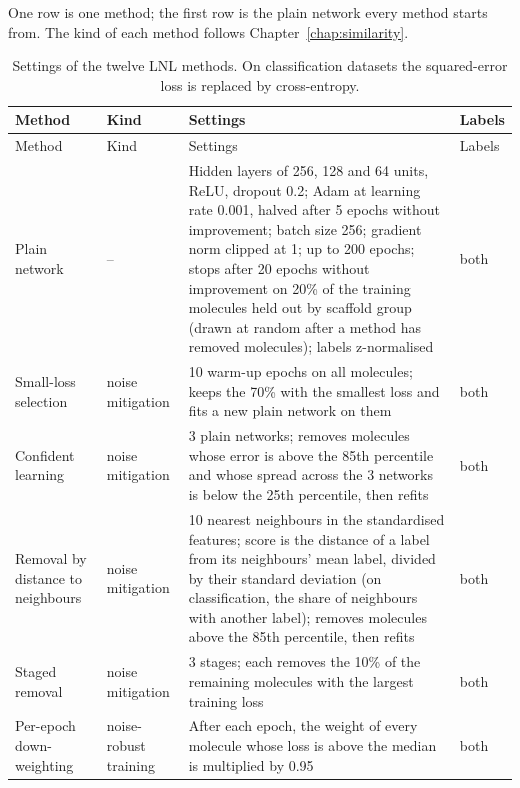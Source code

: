 \label{app:add:lnl_settings}
One row is one method; the first row is the plain network every method starts from. The kind of each method follows Chapter~\ref{chap:similarity}.

{\small
\begin{longtable}{@{}p{2.9cm}p{2.0cm}p{7.3cm}p{1.6cm}@{}}
\caption{Settings of the twelve LNL methods. On classification datasets the squared-error loss is replaced by cross-entropy.}
\label{tab:add:lnl_settings}\\
\toprule
Method & Kind & Settings & Labels \\
\midrule
\endfirsthead
\toprule
Method & Kind & Settings & Labels \\
\midrule
\endhead
Plain network & -- & Hidden layers of 256, 128 and 64 units, ReLU, dropout 0.2; Adam at learning rate 0.001, halved after 5 epochs without improvement; batch size 256; gradient norm clipped at 1; up to 200 epochs; stops after 20 epochs without improvement on 20\% of the training molecules held out by scaffold group (drawn at random after a method has removed molecules); labels z-normalised & both \\
\midrule
Small-loss selection & noise mitigation & 10 warm-up epochs on all molecules; keeps the 70\% with the smallest loss and fits a new plain network on them & both \\
Confident learning & noise mitigation & 3 plain networks; removes molecules whose error is above the 85th percentile and whose spread across the 3 networks is below the 25th percentile, then refits & both \\
Removal by distance to neighbours & noise mitigation & 10 nearest neighbours in the standardised features; score is the distance of a label from its neighbours' mean label, divided by their standard deviation (on classification, the share of neighbours with another label); removes molecules above the 85th percentile, then refits & both \\
Staged removal & noise mitigation & 3 stages; each removes the 10\% of the remaining molecules with the largest training loss & both \\
\midrule
Per-epoch down-weighting & noise-robust training & After each epoch, the weight of every molecule whose loss is above the median is multiplied by 0.95 & both \\

\end{longtable}}
